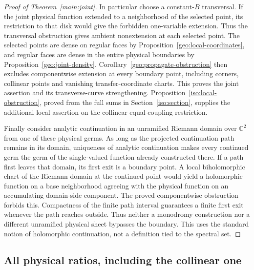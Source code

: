 \documentclass[11pt]{article}
\numberwithin{equation}{section}
\theoremstyle{definition}
\newcommand{\C}{\mathbb C}
\begin{document}
\begin{proof}[Proof of Theorem~\ref{main:joint}]
In particular choose a constant-\(B\) transversal. If the joint
physical function extended to a neighborhood of the selected point,
its restriction to that disk would give the forbidden one-variable
extension. Thus the transversal obstruction gives ambient nonextension at
each selected point. The selected points are dense
on regular faces by Proposition~\ref{geo:local-coordinates}, and
regular faces are dense in the entire physical boundaries by
Proposition~\ref{geo:joint-density}. Corollary~\ref{geo:propagate-obstruction}
then excludes componentwise extension at every boundary point,
including corners, collinear points and vanishing transfer-coordinate
charts. This proves the joint assertion and its transverse-curve
strengthening. Proposition~\ref{iso:local-obstruction}, proved
from the full sums in Section~\ref{iso:section}, supplies the
additional local assertion on the collinear equal-coupling restriction.

Finally consider analytic continuation in an unramified Riemann domain
over \(\C^2\) from one of these physical germs. As long as the
projected continuation path remains in its domain, uniqueness of
analytic continuation makes every continued germ the germ of the
single-valued function already constructed there. If a path first
leaves that domain, its first exit is a boundary point. A local
biholomorphic chart of the Riemann domain at the continued point
would yield a holomorphic function on a base neighborhood agreeing
with the physical function on an accumulating domain-side component.
The proved componentwise obstruction forbids this. Compactness of
the finite path interval guarantees a finite first exit whenever the
path reaches outside. Thus neither a monodromy construction nor a
different unramified physical sheet bypasses the boundary. This
uses the standard notion of holomorphic continuation, not a
definition tied to the spectral set.
\end{proof}

\subsection{All physical ratios, including the collinear one}
\end{document}
